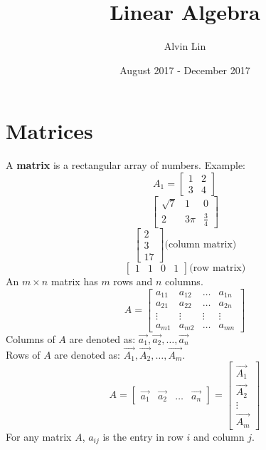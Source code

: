 \documentclass{math}
\title{Linear Algebra}
\author{Alvin Lin}
\date{August 2017 - December 2017}
\begin{document}
\maketitle

\section*{Matrices}
A \textbf{matrix} is a rectangular array of numbers. Example:
\[ A_1 = \begin{bmatrix}1 & 2 \\ 3 & 4\end{bmatrix} \]
\[ \begin{bmatrix}\sqrt{7} & 1 & 0 \\ 2 & 3\pi & \frac{3}{4}\end{bmatrix} \]
\[ \begin{bmatrix}2 \\ 3 \\ 17\end{bmatrix} \text{(column matrix)} \]
\[ \begin{bmatrix}1 & 1 & 0 & 1\end{bmatrix} \text{(row matrix)} \]
An \( m\times n \) matrix has \( m \) rows and \( n \) columns.
\[ A = \begin{bmatrix}
  a_{11} & a_{12} & \dots & a_{1n} \\
  a_{21} & a_{22} & \dots & a_{2n} \\
  \vdots & \vdots & \vdots & \vdots \\
  a_{m1} & a_{m2} & \dots & a_{mn}
\end{bmatrix} \]
Columns of \( A \) are denoted as: \( \vec{a_1},\vec{a_2},\dots,\vec{a_n} \) \\
Rows of \( A \) are denoted as: \( \vec{A_1},\vec{A_2},\dots,\vec{A_m} \).
\[ A = \begin{bmatrix}\vec{a_1} & \vec{a_2} & \dots & \vec{a_n}\end{bmatrix} =
  \begin{bmatrix}\vec{A_1} \\ \vec{A_2} \\ \vdots \\ \vec{A_m}\end{bmatrix} \]
For any matrix \( A \), \( a_{ij} \) is the entry in row \( i \) and column
\( j \).
\end{document}
